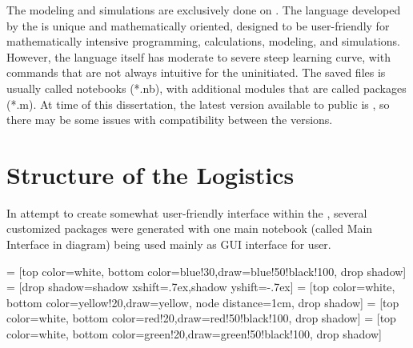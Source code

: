 The modeling and simulations are exclusively done on .  The language developed by the \MathLogo is unique and mathematically oriented, designed to be user-friendly for mathematically intensive programming, calculations, modeling, and simulations.  However, the language itself has moderate to severe steep learning curve, with commands that are not always intuitive for the uninitiated.  The saved \MathLogo files  is usually called notebooks (*.nb), with additional modules that are called packages (*.m).  At time of this dissertation, the latest version available to public is , so there may be some issues with compatibility between the versions. 

\section{Structure of the Logistics}

In attempt to create somewhat user-friendly interface within the , several customized packages were generated with one main notebook (called Main Interface in diagram) being used mainly as GUI interface for user.  

\usetikzlibrary{positioning}
\usetikzlibrary{shadows}

 = [top color=white, bottom color=blue!30,draw=blue!50!black!100, drop shadow]
 = [drop shadow={shadow xshift=.7ex,shadow yshift=-.7ex}]
 = [top color=white, bottom color=yellow!20,draw=yellow, node distance=1cm, drop shadow]
 = [top color=white, bottom color=red!20,draw=red!50!black!100, drop shadow]
 = [top color=white, bottom color=green!20,draw=green!50!black!100, drop shadow]




